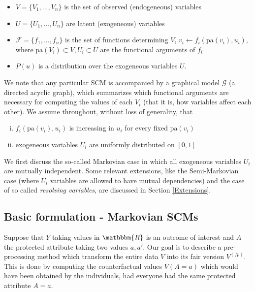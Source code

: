 \documentclass[
  notitle]{jss}
\begin{document}
\begin{itemize}
    \item $V = \lbrace V_1, ..., V_n \rbrace$ is the set of observed (endogeneous) variables
    \item $U = \lbrace U_1, ..., U_n \rbrace$ are latent (exogeneous) variables
    \item $\mathcal{F} = \lbrace f_1, ..., f_n \rbrace$ is the set of functions determining $V$, $v_i \gets f_i(\mathrm{pa}(v_i), u_i)$, where $\mathrm{pa}(V_i) \subset V, U_i \subset U$ are the functional arguments of $f_i$
    \item $P(u)$ is a distribution over the exogeneous variables $U$.
  \end{itemize}

We note that any particular SCM is accompanied by a graphical model
\(\mathcal{G}\) (a directed acyclic graph), which summarizes which
functional arguments are necessary for computing the values of each
\(V_i\) (that it is, how variables affect each other). We assume
throughout, without loss of generality, that

\begin{enumerate}[(i)]
            \item $f_i(\mathrm{pa}(v_i), u_i)$ is increasing in $u_i$ for every fixed $\mathrm{pa}(v_i)$
            \item exogeneous variables $U_i$ are uniformly distributed on $[0, 1]$
\end{enumerate}

We first discuss the so-called Markovian case in which all exogeneous
variables \(U_i\) are mutually independent. Some relevant extensions,
like the Semi-Markovian case (where \(U_i\) variables are allowed to
have mutual dependencies) and the case of so called
\textit{resolving variables}, are discussed in Section \ref{Extensions}.

\hypertarget{basic-formulation---markovian-scms}{%
\subsection{Basic formulation - Markovian
SCMs}\label{basic-formulation---markovian-scms}}

Suppose that \(Y\) taking values in \(\mathbbm{R}\) is an outcome of
interest and \(A\) the protected attribute taking two values \(a, a'\).
Our goal is to describe a pre-processing method which transform the
entire data \(V\) into its fair version \( {V}^{(fp)}\). This is done by
computing the counterfactual values \(V(A = a)\) which would have been
obtained by the individuals, had everyone had the same protected
attribute \(A = a\).
\end{document}
